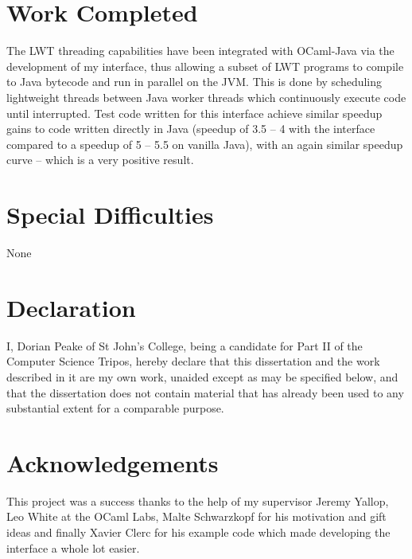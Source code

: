 \documentclass[12pt,twoside,notitlepage]{report}
\begin{document}
\section*{Work Completed}
The LWT threading capabilities have been integrated with OCaml-Java via the development of my interface, thus allowing a subset of LWT programs to compile to Java bytecode and run in parallel on the JVM. This is done by scheduling
lightweight threads between Java worker threads which continuously execute code until interrupted. Test code written for this interface achieve similar speedup gains to code written directly in Java (speedup of 3.5 -- 4 with the
interface compared to a speedup of 5 -- 5.5 on vanilla Java), with an again similar speedup curve -- which is a very positive result. 

\section*{Special Difficulties}
None

\newpage
\section*{Declaration}

I, Dorian Peake of St John's College, being a candidate for Part II of the Computer
Science Tripos, hereby declare
that this dissertation and the work described in it are my own work,
unaided except as may be specified below, and that the dissertation
does not contain material that has already been used to any substantial
extent for a comparable purpose.

\bigskip
{}

\medskip
{}

\cleardoublepage

\tableofcontents

\listoffigures

\newpage
\section*{Acknowledgements}
This project was a success thanks to the help of my supervisor Jeremy Yallop, Leo White at the OCaml Labs, Malte Schwarzkopf for his motivation and gift ideas and finally Xavier Clerc for his example code which made developing the
interface a whole lot easier.
\end{document}
